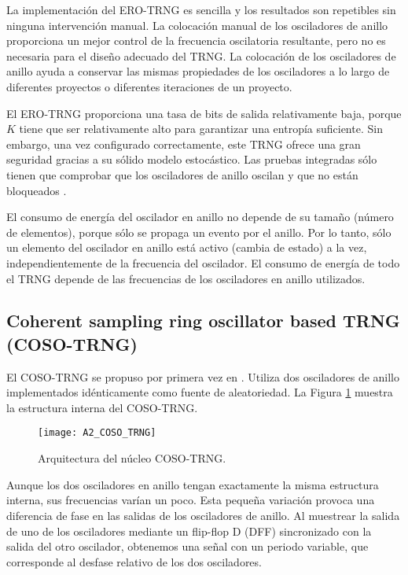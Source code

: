             La implementación del ERO-TRNG es sencilla y los resultados son repetibles sin ninguna intervención manual. La colocación manual de los osciladores de anillo proporciona un mejor control de la frecuencia oscilatoria resultante, pero no es necesaria para el diseño adecuado del TRNG. La colocación de los osciladores de anillo ayuda a conservar las mismas propiedades de los osciladores a lo largo de diferentes proyectos o diferentes iteraciones de un proyecto.

            El ERO-TRNG proporciona una tasa de bits de salida relativamente baja, porque $K$ tiene que ser relativamente alto para garantizar una entropía suficiente. Sin embargo, una vez configurado correctamente, este TRNG ofrece una gran seguridad gracias a su sólido modelo estocástico. Las pruebas integradas sólo tienen que comprobar que los osciladores de anillo oscilan y que no están bloqueados \cite{Bochard2010}.

            El consumo de energía del oscilador en anillo no depende de su tamaño (número de elementos), porque sólo se propaga un evento por el anillo. Por lo tanto, sólo un elemento del oscilador en anillo está activo (cambia de estado) a la vez, independientemente de la frecuencia del oscilador. El consumo de energía de todo el TRNG depende de las frecuencias de los osciladores en anillo utilizados.

		\subsection{Coherent sampling ring oscillator based TRNG (COSO-TRNG)}

                El COSO-TRNG se propuso por primera vez en \cite{Kohlbrenner2004}. Utiliza dos osciladores de anillo implementados idénticamente como fuente de aleatoriedad. La Figura \ref{fig:A2_COSO_TRNG} muestra la estructura interna del COSO-TRNG.
				\begin{figure}[hbtp]
					\caption{Arquitectura del núcleo COSO-TRNG.}
					\centering
					\texttt{[image: A2\_COSO\_TRNG]}
					\label{fig:A2_COSO_TRNG}
				\end{figure}

                Aunque los dos osciladores en anillo tengan exactamente la misma estructura interna, sus frecuencias varían un poco. Esta pequeña variación provoca una diferencia de fase en las salidas de los osciladores de anillo. Al muestrear la salida de uno de los osciladores mediante un flip-flop D (DFF) sincronizado con la salida del otro oscilador, obtenemos una señal con un periodo variable, que corresponde al desfase relativo de los dos osciladores.

